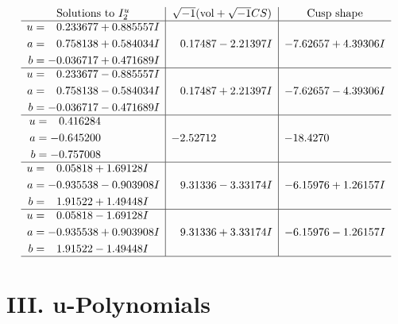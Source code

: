 \documentclass[1p]{elsarticle_modified}
\theoremstyle{definition}
\newcommand{\I}{\sqrt{-1}}
\begin{document}
$$\begin{array}{c|c|c}  
\text{Solutions to }I^u_{2}& \I (\text{vol} + \sqrt{-1}CS) & \text{Cusp shape}\\
 \hline 
\begin{aligned}
u &= \phantom{-}0.233677 + 0.885557 I \\
a &= \phantom{-}0.758138 + 0.584034 I \\
b &= -0.036717 + 0.471689 I\end{aligned}
 & \phantom{-}0.17487 - 2.21397 I & -7.62657 + 4.39306 I \\ \hline\begin{aligned}
u &= \phantom{-}0.233677 - 0.885557 I \\
a &= \phantom{-}0.758138 - 0.584034 I \\
b &= -0.036717 - 0.471689 I\end{aligned}
 & \phantom{-}0.17487 + 2.21397 I & -7.62657 - 4.39306 I \\ \hline\begin{aligned}
u &= \phantom{-}0.416284\phantom{ +0.000000I} \\
a &= -0.645200\phantom{ +0.000000I} \\
b &= -0.757008\phantom{ +0.000000I}\end{aligned}
 & -2.52712\phantom{ +0.000000I} & -18.4270\phantom{ +0.000000I} \\ \hline\begin{aligned}
u &= \phantom{-}0.05818 + 1.69128 I \\
a &= -0.935538 - 0.903908 I \\
b &= \phantom{-}1.91522 + 1.49448 I\end{aligned}
 & \phantom{-}9.31336 - 3.33174 I & -6.15976 + 1.26157 I \\ \hline\begin{aligned}
u &= \phantom{-}0.05818 - 1.69128 I \\
a &= -0.935538 + 0.903908 I \\
b &= \phantom{-}1.91522 - 1.49448 I\end{aligned}
 & \phantom{-}9.31336 + 3.33174 I & -6.15976 - 1.26157 I\\
 \hline 
 \end{array}$$\newpage
\newpage\renewcommand{\arraystretch}{1}
\centering \section*{ III. u-Polynomials}
\end{document}
